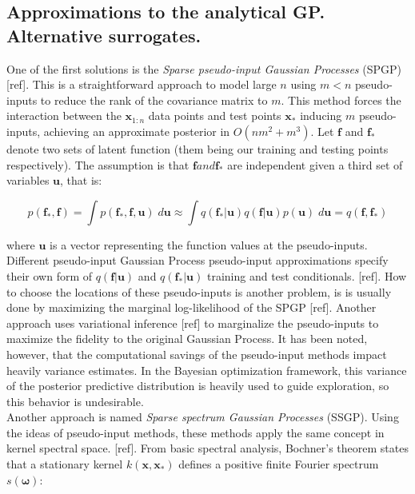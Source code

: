 \documentclass[10pt,a4paper,twoside]{book}
\begin{document}
\subsection{Approximations to the analytical GP. Alternative surrogates.}

One of the first solutions is the \textit{Sparse pseudo-input Gaussian Processes} (SPGP) [ref]. This is a straightforward approach to model large $n$ using $m < n$ pseudo-inputs to reduce the rank of the covariance matrix to $m$. This method forces the interaction between the $\boldsymbol{x}_{1:n}$ data points and test points $\boldsymbol{x}_*$ inducing $m$ pseudo-inputs, achieving an approximate posterior in $O(nm^2 + m^3)$. Let $\boldsymbol{f}$ and $\boldsymbol{f}_*$ denote two sets of latent function (them being our training and testing points respectively). The assumption is that $\boldsymbol{f} and \boldsymbol{f}_*$ are independent given a third set of variables $\boldsymbol{u}$, that is:

\begin{equation}
p\left(\boldsymbol{f}_*, \boldsymbol{f}\right) = \int p(\boldsymbol{f}_*, \boldsymbol{f}, \boldsymbol{u})\; d\boldsymbol{u} \approx \int q(\boldsymbol{f}_*|\boldsymbol{u})q(\boldsymbol{f}|\boldsymbol{u})p(\boldsymbol{u})\; d\boldsymbol{u} = q(\boldsymbol{f}, \boldsymbol{f}_*) 
\end{equation}

where $\boldsymbol{u}$ is a vector representing the function values at the pseudo-inputs. Different pseudo-input Gaussian Process pseudo-input approximations specify their own form of $q(\boldsymbol{f}|\boldsymbol{u})$ and $q(\boldsymbol{f_*|u})$ training and test conditionals. [ref]. How to choose the locations of these pseudo-inputs is another problem, is is usually done by maximizing the marginal log-likelihood of the SPGP [ref]. Another approach uses variational inference [ref] to marginalize the pseudo-inputs to maximize the fidelity to the original Gaussian Process. It has been noted, however, that the computational savings of the pseudo-input methods impact heavily variance estimates. In the Bayesian optimization framework, this variance of the posterior predictive distribution is heavily used to guide exploration, so this behavior is undesirable.\\

Another approach is named \textit{Sparse spectrum Gaussian Processes} (SSGP). Using the ideas of pseudo-input methods, these methods apply the same concept in kernel spectral space. [ref]. From basic spectral analysis, Bochner's theorem states that a stationary kernel $k(\boldsymbol{x}, \boldsymbol{x}_*)$ defines a positive finite Fourier spectrum $s(\boldsymbol{\omega})$:
\end{document}
